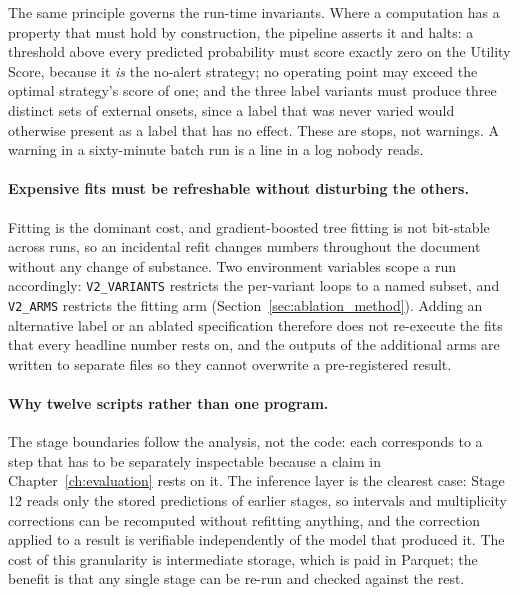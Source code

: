 The same principle governs the run-time invariants. Where a computation has a
property that must hold by construction, the pipeline asserts it and halts:
a threshold above every predicted probability must score exactly zero on the
Utility Score, because it \emph{is} the no-alert strategy; no operating point may
exceed the optimal strategy's score of one; and the three label variants must
produce three distinct sets of external onsets, since a label that was never
varied would otherwise present as a label that has no effect. These are stops,
not warnings. A warning in a sixty-minute batch run is a line in a log nobody
reads.

\paragraph{Expensive fits must be refreshable without disturbing the others.}
Fitting is the dominant cost, and gradient-boosted tree fitting is not
bit-stable across runs, so an incidental refit changes numbers throughout the
document without any change of substance. Two environment variables scope a run
accordingly: \texttt{V2\_VARIANTS} restricts the per-variant loops to a named
subset, and \texttt{V2\_ARMS} restricts the fitting arm
(Section~\ref{sec:ablation_method}). Adding an alternative label or an ablated
specification therefore does not re-execute the fits that every headline number
rests on, and the outputs of the additional arms are written to separate files
so they cannot overwrite a pre-registered result.

\paragraph{Why twelve scripts rather than one program.} The stage boundaries
follow the analysis, not the code: each corresponds to a step that has to be
separately inspectable because a claim in Chapter~\ref{ch:evaluation} rests on
it. The inference layer is the clearest case: Stage 12 reads only the stored
predictions of earlier stages, so intervals and multiplicity corrections can be
recomputed without refitting anything, and the correction applied to a result is
verifiable independently of the model that produced it. The cost of this
granularity is intermediate storage, which is paid in Parquet; the benefit is
that any single stage can be re-run and checked against the rest.

